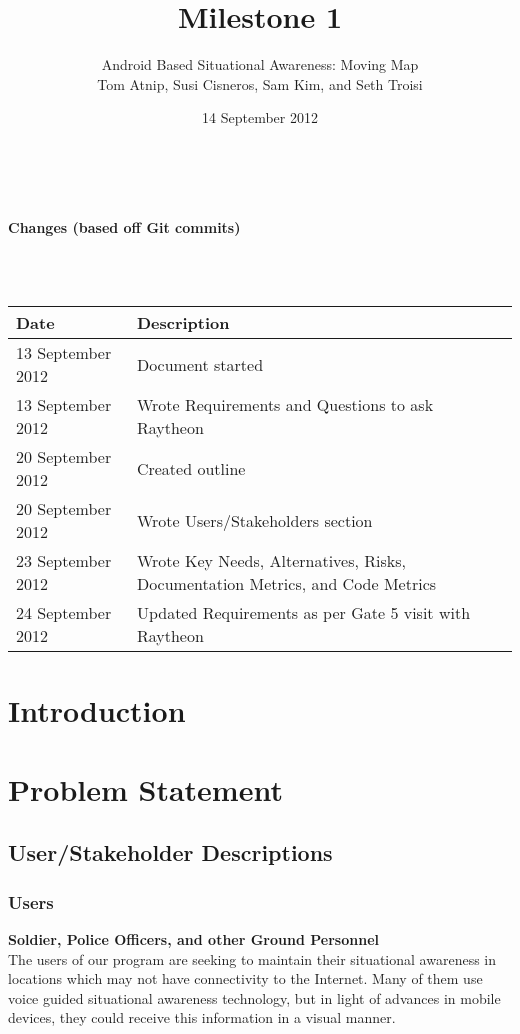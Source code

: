 \documentclass{article}
\begin{document}
\setlength{\voffset}{3.5in}
\title{Milestone 1}
\author{\Large Android Based Situational Awareness: Moving Map\\
Tom Atnip, Susi Cisneros, Sam Kim, and Seth Troisi}
\date{14 September 2012}
\maketitle
\clearpage
\setlength{\voffset}{0pt}
\tableofcontents
\clearpage
~\\
\begin{Large}\textbf{Changes (based off Git commits)}\end{Large}\\
~\\
\begin{tabular}{ | p{1.5in} | p{4.5in} | }
\hline
\textbf{Date} & \textbf{Description}\\
\hline
\hline
13 September 2012 & Document started\\
\hline
13 September 2012 & Wrote Requirements and Questions to ask Raytheon\\
\hline
20 September 2012 & Created outline\\
\hline
20 September 2012 & Wrote Users/Stakeholders section\\
\hline
23 September 2012 & Wrote Key Needs, Alternatives, Risks, Documentation Metrics, and Code Metrics\\
\hline
24 September 2012 & Updated Requirements as per Gate 5 visit with Raytheon\\
\hline
\end{tabular}
\clearpage

\section{Introduction}

\section{Problem Statement}
\subsection{User/Stakeholder Descriptions}
\subsubsection{Users} 
\textbf{Soldier, Police Officers, and other Ground Personnel}\\
The users of our program are seeking to maintain their situational awareness in locations which may not have connectivity to the Internet.  Many of them use voice guided situational awareness technology, but in light of advances in mobile devices, they could receive this information in a visual manner.  
\end{document}

